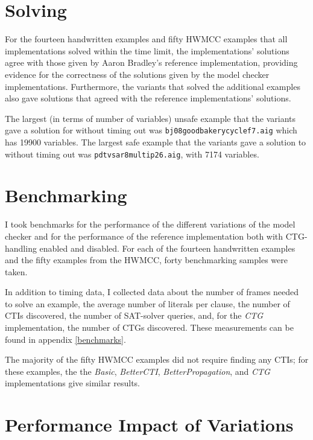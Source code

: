\documentclass[12pt,a4paper,twoside,openright]{report}
\begin{document}
{\section{Solving}

For the fourteen handwritten examples and fifty HWMCC examples that all implementations solved
within the time limit, the
implementations' solutions agree with those given by Aaron Bradley's reference
implementation, providing evidence for the correctness of the solutions given by the model checker
implementations. Furthermore, the variants that solved the additional examples also gave
solutions that agreed with the reference implementations' solutions.

The largest (in terms of number of variables) unsafe example that the variants gave a solution
for without timing out was \verb,bj08goodbakerycyclef7.aig, which has 19900 variables.
The largest safe example that the variants gave a solution
to without timing out was \verb,pdtvsar8multip26.aig,, with 7174 variables.

\section{Benchmarking}
I took benchmarks for the performance of the different variations of the model checker and for the
performance of the reference implementation both with CTG-handling enabled and disabled. For each of the fourteen handwritten examples and the fifty examples from the HWMCC, forty benchmarking samples were taken.

In addition to timing data, I collected data about the number of frames needed to solve an example,
the average number of literals per clause, the number of CTIs discovered, the number of SAT-solver queries,
and, for the \emph{CTG} implementation, the number of CTGs discovered. These measurements can be found in
appendix \ref{benchmarks}.

The majority of the fifty HWMCC examples did not require finding any
CTIs; for these examples, the the {\it Basic}, {\it BetterCTI}, {\it BetterPropagation},
and {\it CTG} implementations give similar results. 

\section{Performance Impact of Variations}

}
\end{document}
